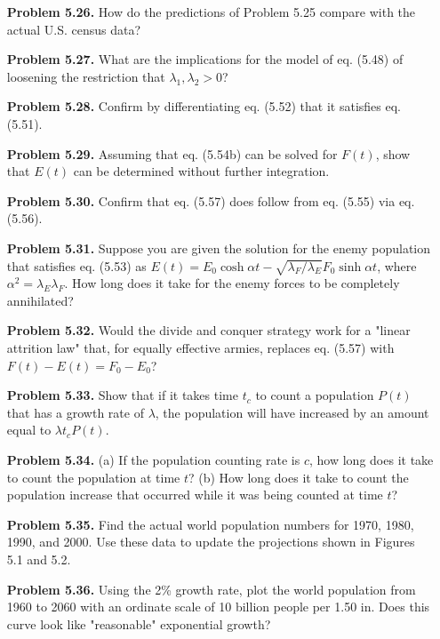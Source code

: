 \begin{enumerate}
    \item[\textbf{Problem 5.26.}] How do the predictions of Problem 5.25 compare with the actual U.S. census data?

    \item[\textbf{Problem 5.27.}] What are the implications for the model of eq. (5.48) of loosening the restriction that $\lambda_1, \lambda_2 > 0$?

    \item[\textbf{Problem 5.28.}] Confirm by differentiating eq. (5.52) that it satisfies eq. (5.51).

    \item[\textbf{Problem 5.29.}] Assuming that eq. (5.54b) can be solved for $F(t)$, show that $E(t)$ can be determined without further integration.

    \item[\textbf{Problem 5.30.}] Confirm that eq. (5.57) does follow from eq. (5.55) via eq. (5.56).

    \item[\textbf{Problem 5.31.}] Suppose you are given the solution for the enemy population that satisfies eq. (5.53) as $E(t) = E_0 \cosh \alpha t - \sqrt{\lambda_F / \lambda_E} F_0 \sinh \alpha t$, where $\alpha^2 = \lambda_E \lambda_F$. How long does it take for the enemy forces to be completely annihilated?

    \item[\textbf{Problem 5.32.}] Would the divide and conquer strategy work for a "linear attrition law" that, for equally effective armies, replaces eq. (5.57) with $F(t) - E(t) = F_0 - E_0$?

    \item[\textbf{Problem 5.33.}] Show that if it takes time $t_c$ to count a population $P(t)$ that has a growth rate of $\lambda$, the population will have increased by an amount equal to $\lambda t_c P(t)$.

    \item[\textbf{Problem 5.34.}] (a) If the population counting rate is $c$, how long does it take to count the population at time $t$? (b) How long does it take to count the population increase that occurred while it was being counted at time $t$?

    \item[\textbf{Problem 5.35.}] Find the actual world population numbers for 1970, 1980, 1990, and 2000. Use these data to update the projections shown in Figures 5.1 and 5.2.

    \item[\textbf{Problem 5.36.}] Using the 2\% growth rate, plot the world population from 1960 to 2060 with an ordinate scale of 10 billion people per 1.50 in. Does this curve look like "reasonable" exponential growth?


\end{enumerate}
